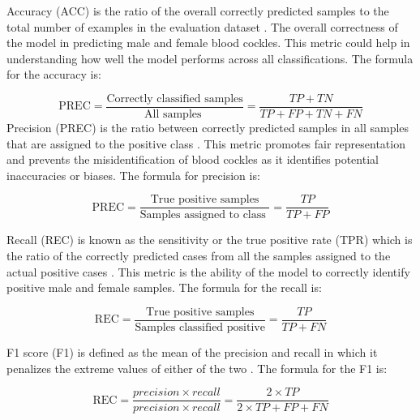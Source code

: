 Accuracy (ACC) is the ratio of the overall correctly predicted samples to the total number of examples in the evaluation dataset \cite{cui2020}. The overall correctness of the model in predicting male and female blood cockles. This metric could help in understanding how well the model performs across all classifications. The formula for the accuracy is: 

\begin{equation}
	\text{PREC} = \frac{\text{Correctly classified samples}} {\text{All samples }} = \frac{TP+ TN}{TP + FP + TN + FN}
	\label{eq:acc}
\end{equation}
Precision (PREC) is the ratio between correctly predicted samples in all samples that are assigned to the positive class \cite{cui2020}. This metric promotes fair representation and prevents the misidentification of blood cockles as it identifies potential inaccuracies or biases. The formula for precision is:


\begin{equation}
	\text{PREC} = \frac{\text{True positive samples}} {\text{Samples assigned to class }} = \frac{TP}{TP + FP}
	\label{eq:prec}
\end{equation}

Recall (REC) is known as the sensitivity or the true positive rate (TPR) which is the ratio of the correctly predicted cases from all the samples assigned to the actual positive cases \cite{cui2020}. This metric is the ability of the model to correctly identify positive male and female samples. The formula for the recall is:

\begin{equation}
	\text{REC} = \frac{\text{True positive samples}} {\text{Samples classified positive}} = \frac{TP}{TP + FN}
	\label{eq:rec}
\end{equation}

F1 score (F1) is defined as the mean of the precision and recall in which it penalizes the extreme values of either of the two \cite{cui2020}. The formula for the F1 is: 

\begin{equation}
	\text{REC} = \frac{ precision \times recall }{precision \times recall }= \frac{2 \times TP}{2 \times TP + FP + FN}
	\label{eq:f1}
\end{equation}




